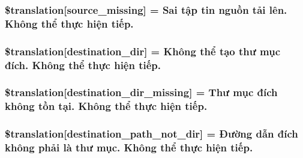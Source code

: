 \subsubsection[{\$translation}]{\setlength{\rightskip}{0pt plus 5cm}\$translation\mbox{[}\textquotesingle{}source\+\_\+missing\textquotesingle{}\mbox{]} = \textquotesingle{}Sai tập tin nguồn tải lên. Không thể thực hiện tiếp.\textquotesingle{}}\label{class_8upload_8vn___v_n_8php_aceaaf7355acaaf10f0ae60378d03c468}
\hypertarget{class_8upload_8vn___v_n_8php_aff2427c72a2598aefa6d58df1dd18b08}{}
\subsubsection[{\$translation}]{\setlength{\rightskip}{0pt plus 5cm}\$translation\mbox{[}\textquotesingle{}destination\+\_\+dir\textquotesingle{}\mbox{]} = \textquotesingle{}Không thể tạo thư mục đích. Không thể thực hiện tiếp.\textquotesingle{}}\label{class_8upload_8vn___v_n_8php_aff2427c72a2598aefa6d58df1dd18b08}
\hypertarget{class_8upload_8vn___v_n_8php_a9ef28d3cf09942c6c0a1e77fa09185e8}{}
\subsubsection[{\$translation}]{\setlength{\rightskip}{0pt plus 5cm}\$translation\mbox{[}\textquotesingle{}destination\+\_\+dir\+\_\+missing\textquotesingle{}\mbox{]} = \textquotesingle{}Thư mục đích không tồn tại. Không thể thực hiện tiếp.\textquotesingle{}}\label{class_8upload_8vn___v_n_8php_a9ef28d3cf09942c6c0a1e77fa09185e8}
\hypertarget{class_8upload_8vn___v_n_8php_a5704a67137126e8c87b7a364175929d4}{}
\subsubsection[{\$translation}]{\setlength{\rightskip}{0pt plus 5cm}\$translation\mbox{[}\textquotesingle{}destination\+\_\+path\+\_\+not\+\_\+dir\textquotesingle{}\mbox{]} = \textquotesingle{}Đường dẫn đích không phải là thư mục. Không thể thực hiện tiếp.\textquotesingle{}}\label{class_8upload_8vn___v_n_8php_a5704a67137126e8c87b7a364175929d4}
\hypertarget{class_8upload_8vn___v_n_8php_a97608ea194a616db49141a0e6dee900c}{}
